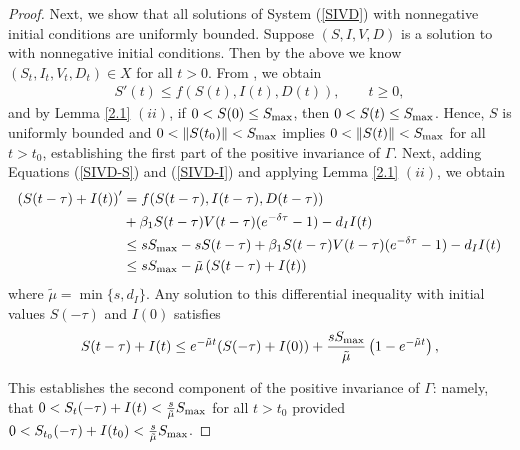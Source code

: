 \documentclass{CMHPhD-SIVD}
\begin{document}
\begin{proof}
%





Next, we show that all solutions of System (\ref{SIVD}) with nonnegative initial conditions are uniformly bounded.
	Suppose $(S, I,  V,  D)$ is a solution to  with nonnegative initial conditions.  Then by the above we know $(S_t,I_t,V_t,D_t)\in X$ for all $t >0$.
	From , we obtain
\begin{align*}
S'(t)\leq f(S(t), I(t), D(t)),   \qquad t\geq0,
\end{align*}
	and by Lemma \ref{2.1} $(ii)$, if $0<S(0)\leq S_{\text{max}}$, then $0< S(t)\leq S_{\text{max}}$.
	Hence, $S$ is uniformly bounded and $0 < \|S(t_0)\| < S_{\text{max}}$ implies $0 < \|S(t)\| < S_{\text{max}}$ for all $t>t_0$, establishing the first part of the positive invariance of $\Gamma$.
Next, adding Equations (\ref{SIVD-S}) and (\ref{SIVD-I}) and applying Lemma \ref{2.1} $(ii)$, we obtain
\begin{align}\label{37}
\left(S(t-\tau)+I(t)\right)'&=f(S(t-\tau), I(t-\tau), D(t-\tau))\nonumber \\
&+\beta_1 S(t-\tau)V(t-\tau)(e^{-\delta\tau}-1)-d_I I(t)\nonumber \\
&
\leq s S_{\text{max}}-s S(t-\tau)+\beta_1 S(t-\tau)V(t-\tau)(e^{-\delta\tau}-1)-d_I I(t)\nonumber \\
&
\leq s S_{\text{max}}-\tilde{\mu}\left(S(t-\tau)+I(t)\right)
\end{align}
where $\tilde{\mu}=\min\{s,d_I\}$.
Any solution to this differential inequality with initial values $S(-\tau)$ and $I(0)$ satisfies
\begin{align*}
S(t-\tau)+I(t)\leq e^{-\tilde{\mu}t}(S(-\tau)+I(0))+\frac{s S_{\text{max}}}{\tilde{\mu}}\left(1-e^{-\tilde{\mu}t}\right),
\end{align*}

This establishes the second component of the positive invariance of $\Gamma$: namely, that $0 < S_t(-\tau) + I(t) < \frac{s}{\tilde{\mu}}S_{\text{max}}$ for all $t>t_0$ provided $0 < S_{t_0}(-\tau) + I(t_0) < \frac{s}{\tilde{\mu}}S_{\text{max}}$.








\end{proof}
\end{document}
